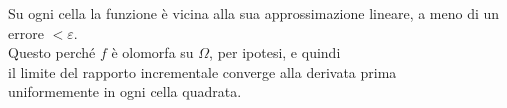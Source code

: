 \documentclass[preview]{standalone}
\begin{document}
\begin{center}
Su ogni cella la funzione è vicina alla sua approssimazione lineare, a meno di un errore $< \varepsilon$. \\Questo perché $f$ è olomorfa su $\Omega$, per ipotesi, e quindi \\il limite del rapporto incrementale converge alla derivata prima \\uniformemente in ogni cella quadrata.
\end{center}
\end{document}

